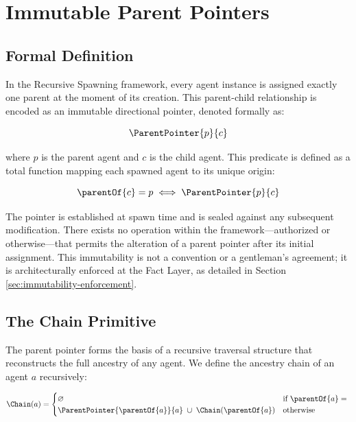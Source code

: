 \section{Immutable Parent Pointers}

\subsection{Formal Definition}

In the Recursive Spawning framework, every agent instance is assigned exactly one parent at the moment of its creation. This parent-child relationship is encoded as an immutable directional pointer, denoted formally as:

\begin{equation}
    \ParentPointer{p}{c}
\end{equation}

where $p$ is the parent agent and $c$ is the child agent. This predicate is defined as a total function mapping each spawned agent to its unique origin:

\begin{equation}
    \parentOf{c} = p \iff \ParentPointer{p}{c}
\end{equation}

The pointer is established at spawn time and is sealed against any subsequent modification. There exists no operation within the framework—authorized or otherwise—that permits the alteration of a parent pointer after its initial assignment. This immutability is not a convention or a gentleman's agreement; it is architecturally enforced at the Fact Layer, as detailed in Section \ref{sec:immutability-enforcement}.

\subsection{The Chain Primitive}

The parent pointer forms the basis of a recursive traversal structure that reconstructs the full ancestry of any agent. We define the ancestry chain of an agent $a$ recursively:

\begin{equation}
    \Chain(a) =
    \begin{cases}
        \varnothing & \text{if } \parentOf{a} = \null \\
        \ParentPointer{\parentOf{a}}{a} \;\cup\; \Chain(\parentOf{a}) & \text{otherwise}
    \end{cases}
\end{equation}

